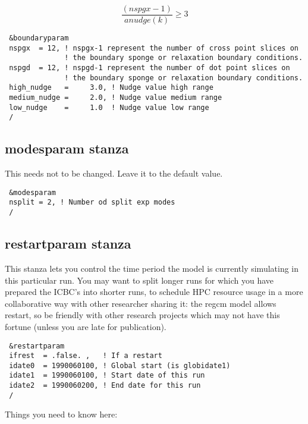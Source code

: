 \begin{equation}
\frac{(nspgx-1)}{anudge(k)} \ge 3
\end{equation}

{\footnotesize
\begin{Verbatim}
 &boundaryparam
 nspgx  = 12, ! nspgx-1 represent the number of cross point slices on
              ! the boundary sponge or relaxation boundary conditions.
 nspgd  = 12, ! nspgd-1 represent the number of dot point slices on
              ! the boundary sponge or relaxation boundary conditions.
 high_nudge   =     3.0, ! Nudge value high range
 medium_nudge =     2.0, ! Nudge value medium range
 low_nudge    =     1.0  ! Nudge value low range
 /
\end{Verbatim}
}

\subsection{modesparam stanza}

This needs not to be changed. Leave it to the default value.

{\footnotesize
\begin{Verbatim}
 &modesparam
 nsplit = 2, ! Number od split exp modes
 /
\end{Verbatim}
}

\subsection{restartparam stanza}

This stanza lets you control the time period the model is currently simulating
in this particular run. You may want to split longer runs for which you have
prepared the ICBC's into shorter runs, to schedule HPC resource usage in a more
collaborative way with other researcher sharing it: the regcm model allows
restart, so be friendly with other research projects which may not have this
fortune (unless you are late for publication).

{\footnotesize
\begin{Verbatim}
 &restartparam
 ifrest  = .false. ,   ! If a restart
 idate0  = 1990060100, ! Global start (is globidate1)
 idate1  = 1990060100, ! Start date of this run
 idate2  = 1990060200, ! End date for this run
 /
\end{Verbatim}
}

Things you need to know here:

